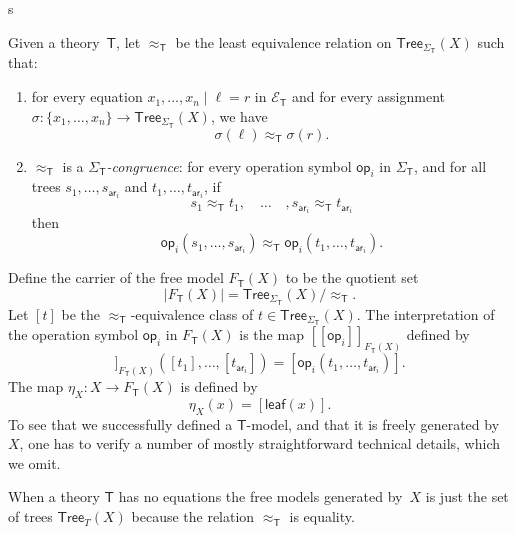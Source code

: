 s\documentclass{amsart}
\newcommand{\theory}[1]{\mathsf{#1}} %
\newcommand{\signature}[1]{\Sigma_{\theory{#1}}} %
\newcommand{\equations}[1]{\mathcal{E}_{\theory{#1}}} %
\newcommand{\carrier}[1]{|#1|} %
\newcommand{\Free}[2]{F_{\theory{#1}}(#2)} %
\newcommand{\set}[1]{\{#1\}} %
\newcommand{\Tree}[2]{\mathsf{Tree}_{#1}(#2)} %
\newcommand{\leaf}[1]{\mathsf{leaf}(#1)} %
\newcommand{\op}[1]{\mathsf{op}_{#1}} %
\newcommand{\arity}[1]{\mathsf{ar}_{#1}} %
\newcommand{\sem}[1]{[\![#1]\!]} %
\begin{document}
Given a theory~$\theory{T}$, let $\approx_\theory{T}$ be the least equivalence relation on
$\Tree{\signature{T}}{X}$ such that:
%
\begin{enumerate}
\item for every equation $x_1, \ldots, x_n \mid \ell = r$ in $\equations{T}$ and for every
  assignment $\sigma : \set{x_1, \ldots, x_n} \to \Tree{\signature{T}}{X}$, we have
  \begin{equation*}
    \sigma(\ell) \approx_{\theory{T}} \sigma(r).
  \end{equation*}
\item $\approx_{\theory{T}}$ is a \emph{$\signature{T}$-congruence}: for every
  operation symbol $\op{i}$ in $\signature{T}$, and for all trees
  $s_1, \ldots, s_{\arity{i}}$ and $t_1, \ldots, t_{\arity{i}}$, if
  \begin{equation*}
    s_1 \approx_{\theory{T}} t_1,
    \quad \ldots \quad,
    s_{\arity{i}} \approx_{\theory{T}} t_{\arity{i}}
  \end{equation*}
  then
  \begin{equation*}
    \op{i}(s_1, \ldots, s_{\arity{i}}) \approx_{\theory{T}}
    \op{i}(t_1, \ldots, t_{\arity{i}}).
  \end{equation*}
\end{enumerate}
%
Define the carrier of the free model $\Free{T}{X}$ to be the quotient set
%
\begin{equation*}
  \carrier{\Free{T}{X}} = \Tree{\signature{T}}{X} / {\approx_{\theory{T}}}.
\end{equation*}
%
Let $[t]$ be the $\approx_{\theory{T}}$-equivalence class of
$t \in \Tree{\signature{T}}{X}$. The interpretation of the operation symbol $\op{i}$ in
  $\Free{T}{X}$ is the map $\sem{\op{i}}_{\Free{T}{X}}$ defined by
%
\begin{equation*}
  \sem{\op{i}}_{\Free{T}{X}}([t_1], \ldots, [t_{\arity{i}}]) =
  [\op{i}(t_1, \ldots, t_{\arity{i}})].
\end{equation*}
%
The map $\eta_X : X \to \Free{T}{X}$ is defined by
%
\begin{equation*}
  \eta_X(x) = [\leaf{x}].
\end{equation*}
%
To see that we successfully defined a $\theory{T}$-model, and that it is freely generated
by~$X$, one has to verify a number of mostly straightforward technical details, which we
omit.

When a theory $\theory{T}$ has no equations the free models generated by~$X$ is just the
set of trees $\Tree{T}{X}$ because the relation $\approx_{\theory{T}}$ is equality.
\end{document}
